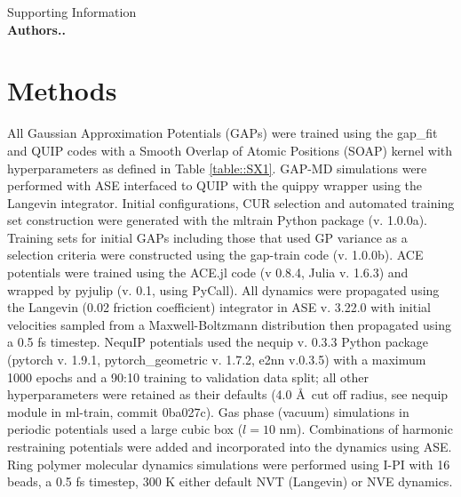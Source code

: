 \documentclass[11pt]{article}
\numberwithin{equation}{subsection}
\begin{document}
	
\begin{titlepage}
	\vspace*{\fill}
	\begin{center}
		{\huge Supporting Information}\\
		\vspace{0.2cm}
		{\large\bfseries{Authors..}}
	\end{center}
	\vspace*{\fill}

\end{titlepage}	
\newpage

\tableofcontents
\clearpage


\section{Methods} \label{section::SI_methods}

All Gaussian Approximation Potentials (GAPs) were trained using the gap\_fit and QUIP codes with a Smooth Overlap of Atomic Positions (SOAP)\cite{Bartk2013} kernel with hyperparameters as defined in Table \ref{table::SX1}. GAP-MD simulations were performed with ASE\cite{HjorthLarsen2017} interfaced to QUIP with the quippy wrapper using the Langevin integrator. Initial configurations, CUR\cite{Mahoney2009} selection and automated training set construction were generated with the mltrain Python package (v. 1.0.0a).\cite{Young2021mlt} Training sets for initial GAPs including those that used GP variance as a selection criteria were constructed using the gap-train code (v. 1.0.0b).\cite{Young2021gt} ACE\cite{Kovacs2021, Drautz2019} potentials were trained using the ACE.jl code\cite{Ortner_ACE} (v 0.8.4, Julia v. 1.6.3) and wrapped by pyjulip (v. 0.1, using PyCall). All dynamics were propagated using the Langevin (0.02 friction coefficient) integrator in ASE v. 3.22.0 with initial velocities sampled from a Maxwell-Boltzmann distribution then propagated using a 0.5 fs timestep. NequIP\cite{Batzner2021} potentials used the nequip\cite{nequip_github} v. 0.3.3 Python package (pytorch v. 1.9.1, pytorch\_geometric v. 1.7.2, e2nn\cite{e3nn} v.0.3.5) with a maximum 1000 epochs and a 90:10 training to validation data split; all other hyperparameters were retained as their defaults (4.0 \AA~cut off radius, see nequip module in ml-train, commit 0ba027c). Gas phase (vacuum) simulations in periodic potentials used a large cubic box ($l = 10$ nm). Combinations of harmonic restraining potentials were added and incorporated into the dynamics using ASE. Ring polymer molecular dynamics simulations were performed using I-PI\cite{Kapil2019} with 16 beads, a 0.5 fs timestep, 300 K either default NVT (Langevin) or NVE dynamics. 
\end{document}
